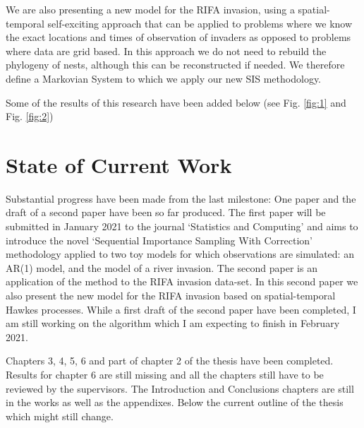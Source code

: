 \documentclass[11pt,a4paper]{article}
\begin{document}
We are also presenting a new model for the RIFA invasion, using a spatial-temporal self-exciting approach that can be applied to problems where we know the exact locations and times of observation of invaders as opposed to problems where data are grid based. In this approach we do not need to rebuild the phylogeny of nests, although this can be reconstructed if needed. We therefore define a Markovian System to which we apply our new SIS methodology.

Some of the results of this research have been added below (see Fig. \ref{fig:1} and Fig. \ref{fig:2})
\section{State of Current Work}

Substantial progress have been made from the last milestone: One paper and the draft of a second paper have been so far produced. The first paper will be submitted in January 2021 to the journal `Statistics and Computing' and aims to introduce the novel `Sequential Importance Sampling With Correction' methodology applied to two toy models for which observations are simulated: an AR(1) model, and the model of a river invasion. The second paper is an application of the method to the RIFA invasion data-set. In this second paper we also present the new model for the RIFA invasion based on spatial-temporal Hawkes processes. While a first draft of the second paper have been completed, I am still working on the algorithm which I am expecting to finish in February 2021.

Chapters 3, 4, 5, 6 and part of chapter 2 of the thesis have been completed. Results for chapter 6 are still missing and all the chapters still have to be reviewed by the supervisors. The Introduction and Conclusions chapters are still in the works as well as the appendixes. Below the current outline of the thesis which might still change.
\end{document}
